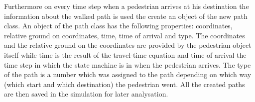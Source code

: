Furthermore on every time step when a pedestrian arrives at his destination the information about the walked path is used the create an object of the new path class. An object of the path class has the following properties: coordinates, relative ground on coordinates, time, time of arrival and type. The coordinates and the relative ground on the coordinates are provided by the pedestrian object itself while time is the result of the travel-time equation and time of arrival the time step in which the state machine is in when the pedestrian arrives. The type of the path is a number which was assigned to the path depending on which way (which start and which destination) the pedestrian went. All the created paths are then saved in the simulation for later analysation.
